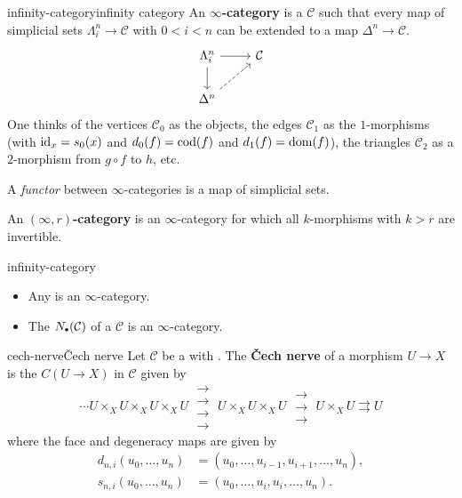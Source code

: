 \begin{topic}{infinity-category}{infinity category}
    An \textbf{$\infty$-category} is a  $\mathcal{C}$ such that every map of simplicial sets $\Lambda^n_i \to \mathcal{C}$ with $0 < i < n$ can be extended to a map $\Delta^n \to \mathcal{C}$.
    \[ \begin{tikzcd} \Lambda^n_i \arrow{r} \arrow{d} & \mathcal{C} \\ \Delta^n \arrow[dashed]{ur} & \end{tikzcd} \]
    One thinks of the vertices $\mathcal{C}_0$ as the objects, the edges $\mathcal{C}_1$ as the $1$-morphisms (with $\textup{id}_x = s_0(x)$ and $d_0(f) = \textup{cod}(f)$ and $d_1(f) = \textup{dom}(f)$), the triangles $\mathcal{C}_2$ as a $2$-morphism from $g \circ f$ to $h$, etc.
    
    A \textit{functor} between $\infty$-categories is a map of simplicial sets.
    
    An \textbf{$(\infty, r)$-category} is an $\infty$-category for which all $k$-morphisms with $k > r$ are invertible.
\end{topic}

\begin{example}{infinity-category}
    \begin{itemize}
        \item Any  is an $\infty$-category.
        \item The  $N_\bdot(\mathcal{C})$ of a  $\mathcal{C}$ is an $\infty$-category.
    \end{itemize}
\end{example}

\begin{topic}{cech-nerve}{Čech nerve}
    Let $\mathcal{C}$ be a  with . The \textbf{Čech nerve} of a morphism $U \to X$ is the  $C(U \to X)$ in $\mathcal{C}$ given by
    \[ \cdots U \times_X U \times_X U \times_X U \; \substack{\rightarrow \\[-0.9em] \rightarrow \\[-0.9em] \rightarrow \\[-0.9em] \rightarrow} \; U \times_X U \times_X U \; \substack{\rightarrow \\[-0.9em] \rightarrow \\[-0.9em] \rightarrow} \; U \times_X U \rightrightarrows U \]
    where the face and degeneracy maps are given by
    \[ \begin{aligned}
        d_{n, i}(u_0, \ldots, u_n) &= (u_0, \ldots, u_{i - 1}, u_{i + 1}, \ldots, u_n), \\
        s_{n, i}(u_0, \ldots, u_n) &= (u_0, \ldots, u_i, u_i, \ldots, u_n) .
    \end{aligned} \]
\end{topic}

